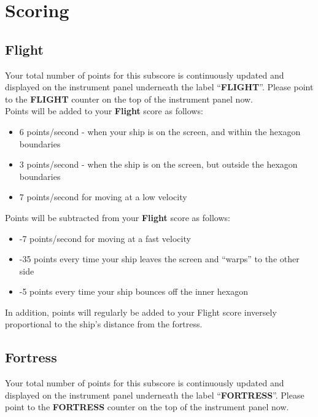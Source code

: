 \documentclass[letterpaper,12pt]{article}
\begin{document}
\section{Scoring}

\subsection{Flight}

Your total number of points for this subscore is continuously updated and displayed on
the instrument panel underneath the label ``\textbf{FLIGHT}''. Please point to the \textbf{FLIGHT}
counter on the top of the instrument panel now.\\

\noindent
Points will be added to your \textbf{Flight} score as follows:
\begin{itemize}
\item 6 points/second - when your ship is on the screen, and within the hexagon
boundaries
\item 3 points/second - when the ship is on the screen, but outside the hexagon
boundaries
\item 7 points/second for moving at a low velocity
\end{itemize}

\noindent
Points will be subtracted from your \textbf{Flight} score as follows:
\begin{itemize}
\item -7 points/second for moving at a fast velocity
\item -35 points every time your ship leaves the screen and ``warps'' to the other side
\item -5 points every time your ship bounces off the inner hexagon
\end{itemize}

\noindent
In addition, points will regularly be added to your Flight score inversely proportional to the ship's distance from the fortress.

\subsection{Fortress}

Your total number of points for this subscore is continuously updated and displayed on
the instrument panel underneath the label ``\textbf{FORTRESS}''. Please point to the
\textbf{FORTRESS} counter on the top of the instrument panel now.\\
\end{document}
